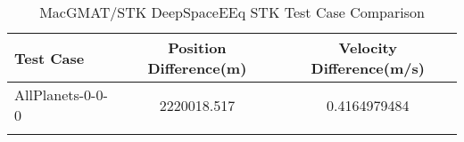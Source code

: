 \begin{table}[htbp!]
\centering
\caption{ MacGMAT/STK DeepSpaceEEq STK Test Case Comparison}
      \begin{tabular}{lcc}
      \hline\hline
          Test Case & Position Difference(m) & Velocity Difference(m/s) \\
         \hline
         AllPlanets-0-0-0 & 2220018.517 & 0.4164979484 \\
      \hline\hline
      \label{Table: DeepSpaceEEq STK Table} 
\end{tabular}
\end{table}
